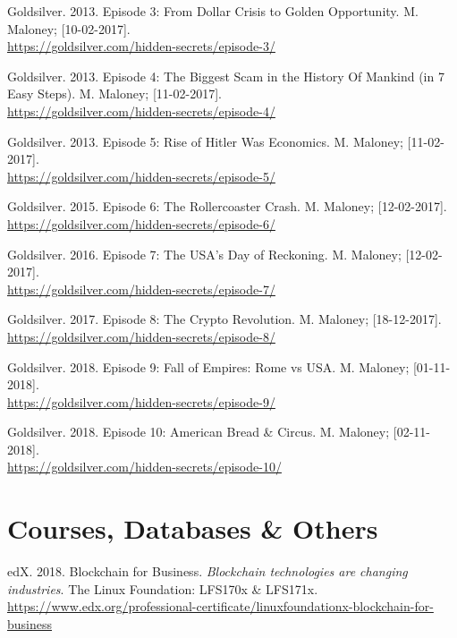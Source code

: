 \begin{thebibliography}{25}
Goldsilver. 2013. Episode 3: From Dollar Crisis to Golden Opportunity.
M. Maloney; [10-02-2017].\\ \url{https://goldsilver.com/hidden-secrets/episode-3/}

Goldsilver. 2013. Episode 4: The Biggest Scam in the History Of Mankind (in 7 Easy Steps).
M. Maloney; [11-02-2017].\\ \url{https://goldsilver.com/hidden-secrets/episode-4/}

Goldsilver. 2013. Episode 5: Rise of Hitler Was Economics.
M. Maloney; [11-02-2017].\\ \url{https://goldsilver.com/hidden-secrets/episode-5/}

Goldsilver. 2015. Episode 6: The Rollercoaster Crash.
M. Maloney; [12-02-2017].\\ \url{https://goldsilver.com/hidden-secrets/episode-6/}

Goldsilver. 2016. Episode 7: The USA's Day of Reckoning. M. Maloney; [12-02-2017].\\
\url{https://goldsilver.com/hidden-secrets/episode-7/}

Goldsilver. 2017. Episode 8: The Crypto Revolution.
M. Maloney; [18-12-2017].\\ \url{https://goldsilver.com/hidden-secrets/episode-8/}

Goldsilver. 2018. Episode 9: Fall of Empires: Rome vs USA.
M. Maloney; [01-11-2018].\\ \url{https://goldsilver.com/hidden-secrets/episode-9/}

Goldsilver. 2018. Episode 10: American Bread \& Circus. 
M. Maloney; [02-11-2018].\\ \url{https://goldsilver.com/hidden-secrets/episode-10/}

\section*{Courses, Databases \& Others}

edX. 2018. Blockchain for Business. \emph{Blockchain technologies are changing industries}.
The Linux Foundation: LFS170x \& LFS171x.\\ \url{https://www.edx.org/professional-certificate/linuxfoundationx-blockchain-for-business}


\end{thebibliography}
